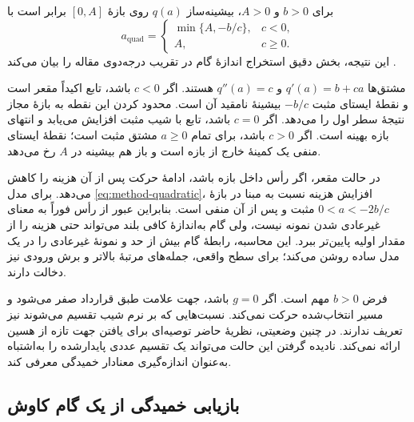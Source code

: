 \begin{لم}
\label{lem:method-quadratic-optimum}
برای $b>0$ و $A>0$، بیشینه‌ساز $q(a)$ روی بازهٔ $[0,A]$ برابر است با
\begin{equation}
a_{\mathrm{quad}}=
\begin{cases}
\min\{A,-b/c\},&c<0,\\
A,&c\geq0.
\end{cases}
\label{eq:method-quadratic-optimum}
\end{equation}
این نتیجه، بخش دقیق استخراج اندازهٔ گام در تقریب درجه‌دوی مقاله را بیان می‌کند \cite{sora2026}.
\end{لم}

\begin{اثبات}
مشتق‌ها $q'(a)=b+ca$ و $q''(a)=c$ هستند. اگر $c<0$ باشد، تابع اکیداً مقعر است و نقطهٔ ایستای مثبت $-b/c$ بیشینهٔ نامقید آن است. محدود کردن این نقطه به بازهٔ مجاز نتیجهٔ سطر اول را می‌دهد. اگر $c=0$ باشد، تابع با شیب مثبت افزایش می‌یابد و انتهای بازه بهینه است. اگر $c>0$ باشد، برای تمام $a\geq0$ مشتق مثبت است؛ نقطهٔ ایستای منفی یک کمینهٔ خارج از بازه است و باز هم بیشینه در $A$ رخ می‌دهد.
\end{اثبات}

در حالت مقعر، اگر رأس داخل بازه باشد، ادامهٔ حرکت پس از آن هزینه را کاهش می‌دهد. برای مدل \eqref{eq:method-quadratic}، افزایش هزینه نسبت به مبنا در بازهٔ $0<a<-2b/c$ مثبت و پس از آن منفی است. بنابراین عبور از رأس فوراً به معنای غیرعادی شدن نمونه نیست، ولی گام به‌اندازهٔ کافی بلند می‌تواند حتی هزینه را از مقدار اولیه پایین‌تر ببرد. این محاسبه، رابطهٔ گام بیش از حد و نمونهٔ غیرعادی را در یک مدل ساده روشن می‌کند؛ برای سطح واقعی، جمله‌های مرتبهٔ بالاتر و برش ورودی نیز دخالت دارند.

فرض $b>0$ مهم است. اگر $g=0$ باشد، جهت علامت طبق قرارداد صفر می‌شود و مسیر انتخاب‌شده حرکت نمی‌کند. نسبت‌هایی که بر نرم شیب تقسیم می‌شوند نیز تعریف ندارند. در چنین وضعیتی، نظریهٔ حاضر توصیه‌ای برای یافتن جهت تازه از هسین ارائه نمی‌کند. نادیده گرفتن این حالت می‌تواند یک تقسیم عددی پایدارشده را به‌اشتباه به‌عنوان اندازه‌گیری معنادار خمیدگی معرفی کند.

\subsection{بازیابی خمیدگی از یک گام کاوش}
\label{sec:method-probe}

